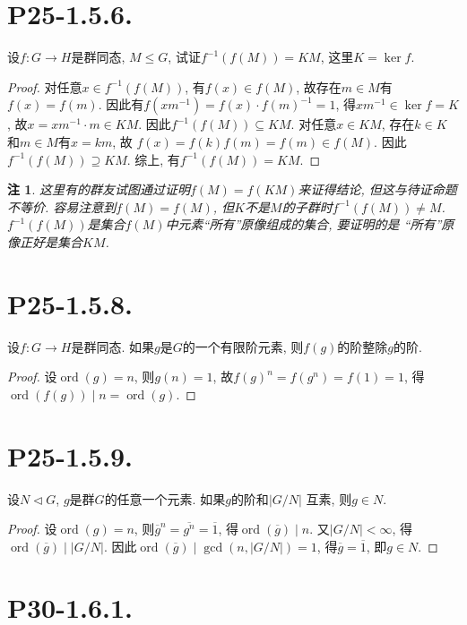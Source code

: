 \documentclass[12pt, a4paper, fontset=windows]{ctexart}
\newcommand{\abs}[1]{\left|{#1}\right|}
\newcommand{\cl}[1]{\overline{#1}} %
\newcommand{\ord}{\operatorname{ord}}
\newcommand{\yh}[1]{“{#1}”} %
\newtheorem*{remark}{注}
\begin{document}
\section*{P25-1.5.6.}

设$f:G\to H$是群同态, $M\le G$, 试证$f^{-1}(f(M))=KM$, 这里$K=\ker f$. 

\begin{proof}
对任意$x\in f^{-1}(f(M))$, 有$f(x)\in f(M)$, 故存在$m\in M$有
$f(x)=f(m)$. 因此有$f(xm^{-1})=f(x)\cdot f(m)^{-1}=1$, 得$xm^{-1}\in\ker f=K$, 
故$x=xm^{-1}\cdot m\in KM$. 因此$f^{-1}(f(M))\subseteq KM$. 
对任意$x\in KM$, 存在$k\in K$和$m\in M$有$x=km$, 故
$f(x)=f(k)f(m)=f(m)\in f(M)$. 因此$f^{-1}(f(M))\supseteq KM$. 
综上, 有$f^{-1}(f(M))=KM$. 
\end{proof}

\begin{remark}
这里有的群友试图通过证明$f(M)=f(KM)$来证得结论, 但这与待证命题不等价. 
容易注意到$f(M)=f(M)$, 但$K$不是$M$的子群时$f^{-1}(f(M))\ne M$. 
$f^{-1}(f(M))$是集合$f(M)$中元素\yh{所有}原像组成的集合, 要证明的是
\yh{所有}原像正好是集合$KM$. 
\end{remark}

\section*{P25-1.5.8.}

设$f:G\to H$是群同态. 如果$g$是$G$的一个有限阶元素, 则$f(g)$的阶整除$g$的阶. 

\begin{proof}
设$\ord(g)=n$, 则$g(n)=1$, 故$f(g)^n=f(g^n)=f(1)=1$, 得$\ord(f(g))\mid n=\ord(g)$. 
\end{proof}

\section*{P25-1.5.9.}

设$N\lhd G$, $g$是群$G$的任意一个元素. 如果$g$的阶和$\abs{G/N}$
互素, 则$g\in N$. 

\begin{proof}
设$\ord(g)=n$, 则$\cl{g}^n=\cl{g^n}=\cl{1}$, 
得$\ord(\cl{g})\mid n$. 又$\abs{G/N}<\infty$, 得
$\ord(\cl{g})\mid\abs{G/N}$. 因此$\ord(\cl{g})\mid\gcd(n,\abs{G/N})=1$, 
得$\cl{g}=\cl{1}$, 即$g\in N$. 
\end{proof}

\section*{P30-1.6.1.}
\end{document}

